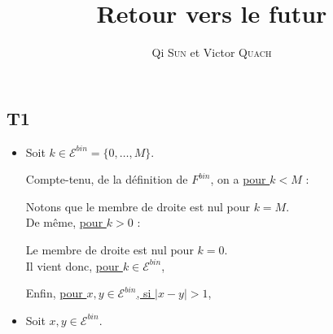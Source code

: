 \documentclass[a4paper,11pt]{article}
\title{Retour vers le futur}
\author{Qi \textsc{Sun} et Victor \textsc{Quach}}
\date{}
\def \E{\mathcal{E}}
\begin{document}
\maketitle

\subsection*{T1}

\begin{itemize}
\item[\textbullet]
Soit $k \in \E^{bin}=\{0, \dots, M\}$. 

Compte-tenu, de la définition de $F^{bin}$, on a \underline{pour $k<M$} :


\begin{center}
\end{center}

Notons que le membre de droite est nul pour $k=M$.\\


De même, \underline{pour $k>0$} : 
\begin{center}
\end{center}
Le membre de droite est nul pour $k=0$.\\


Il vient donc, \underline{pour $k \in \E^{bin}$},
\begin{center}
\end{center}

\vspace{5mm}
Enfin, \underline{pour $x,y \in \E^{bin}$, si $|x-y|>1$},
\begin{center}
\end{center}
\vspace{5mm}



\item[\textbullet]
Soit $x,y \in \E^{bin}$.


\end{itemize}
\end{document}
